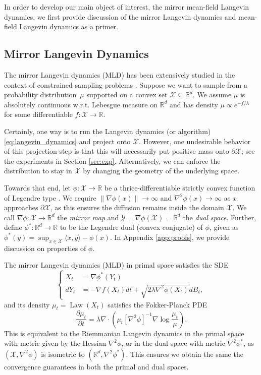 \documentclass{article}
\begin{document}
In order to develop our main object of interest, the mirror mean-field Langevin dynamics, we first provide discussion of the mirror Langevin dynamics and mean-field Langevin dynamics as a primer.


\subsection{Mirror Langevin Dynamics}\label{sec:mirror_ld}
The mirror Langevin dynamics (MLD) has been extensively studied in the context of constrained sampling problems \citep{zhang2020wasserstein,jiang2021mirror,li2022mirror}. Suppose we want to sample from a probability distribution~$\mu$ supported on a convex set $\mathcal{X}\subseteq \mathbb{R}^d$. We assume $\mu$ is absolutely continuous w.r.t. Lebesgue measure on $\mathbb{R}^d$ and has density $\mu\propto e^{-f/\lambda}$ for some differentiable $f:\mathcal{X}\to\mathbb{R}$. 

Certainly, one way is to run the Langevin dynamics (or algorithm) \eqref{eq:langevin_dynamics} and project onto $\mathcal{X}$. However, one undesirable behavior of this projection step is that this will necessarily put positive mass onto $\partial\mathcal{X}$; see the experiments in Section \ref{sec:exp}. Alternatively, we can enforce the distribution to stay in $\mathcal{X}$ by changing the geometry of the underlying space. 

Towards that end, let $\phi:\mathcal{X}\to\mathbb{R}$ be a thrice-differentiable strictly convex function of Legendre type \citep{rockafellar1997convex}. We require $\|\nabla \phi(x)\|\to \infty$ and $\nabla^2\phi(x)\to\infty$ as $x$ approaches $\partial\mathcal{X}$, as this ensures the diffusion remains inside the domain $\mathcal{X}$. We call $\nabla\phi:\mathcal{X}\to\mathbb{R}^d$ the \emph{mirror map} and $\mathcal{Y}=\nabla\phi(\mathcal{X})=\mathbb{R}^d$ the \emph{dual space}. Further, define $\phi^*:\mathbb{R}^d\to\mathbb{R}$ to be the Legendre dual (convex conjugate) of $\phi$, given as $\phi^*(y) = \sup_{x\in\mathcal{X}}\langle x,y\rangle - \phi(x)$. In Appendix \ref{app:proofs}, we provide discussion on properties of $\phi$.

The mirror Langevin dynamics (MLD) in primal space satisfies the SDE \begin{equation}\label{eq:mld_primal}
\begin{cases}
    X_t &= \nabla\phi^*(Y_t)\\
    dY_t &= -\nabla f(X_t)dt + \sqrt{2\lambda\nabla^2\phi(X_t)}dB_t,
\end{cases}
\end{equation}
and its density $\mu_t = \operatorname{Law}(X_t)$ satisfies the Fokker-Planck PDE \[
\frac{\partial \mu_t}{\partial t} = \lambda \nabla \cdot \left(\mu_t [\nabla^2\phi]^{-1}\nabla \log \frac{\mu_t}{\mu}\right).
\]
This is equivalent to the Riemmanian Langevin dynamics in the primal space with metric given by the Hessian $\nabla^2\phi$, or in the dual space with metric $\nabla^2\phi^*$, as $(\mathcal{X},\nabla^2\phi)$ is isometric to $(\mathbb{R}^d,\nabla^2\phi^*)$. This ensures we obtain the same the convergence guarantees in both the primal and dual spaces. 
\end{document}
